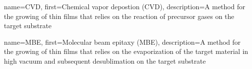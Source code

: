 {
    name={CVD},
    first={Chemical vapor depostion (CVD)},
    description={A method for the growing of thin films that relies on the reaction of precursor gases on the target substrate}
}

{
    name={MBE},
    first={Molecular beam epitaxy (MBE)},
    description={A method for the growing of thin films that relies on the evaporization of the target material in high vacuum and subsequent desublimation on the target substrate}
}